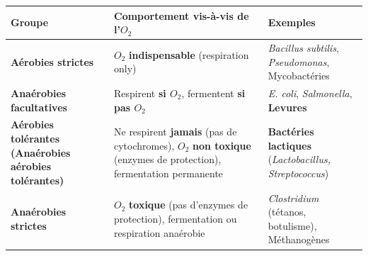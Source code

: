 \documentclass[11pt]{article}
\begin{document}
\begin{propriete}
    \begin{center}
    \begin{tabular}{|l|l|l|}\hline
    \rowcolor{popblueL}
    \textbf{Groupe} & \textbf{Comportement vis-à-vis de l'$O_2$} & \textbf{Exemples} \\ \hline
    \textbf{Aérobies strictes} & $O_2$ \textbf{indispensable} (respiration only) & \emph{Bacillus subtilis}, \emph{Pseudomonas}, Mycobactéries \\ \hline
    \textbf{Anaérobies facultatives} & Respirent \textbf{si $O_2$}, fermentent \textbf{si pas $O_2$} & \emph{E. coli}, \emph{Salmonella}, \textbf{Levures} \\ \hline
    \textbf{Aérobies tolérantes (Anaérobies aérobies tolérantes)} & Ne respirent \textbf{jamais} (pas de cytochromes), $O_2$ \textbf{non toxique} (enzymes de protection), fermentation permanente & \textbf{Bactéries lactiques} (\emph{Lactobacillus, Streptococcus}) \\ \hline
    \textbf{Anaérobies strictes} & $O_2$ \textbf{toxique} (pas d'enzymes de protection), fermentation ou respiration anaérobie & \emph{Clostridium} (tétanos, botulisme), Méthanogènes \\ \hline
    \end{tabular}
    \end{center}
\end{propriete}
\end{document}
